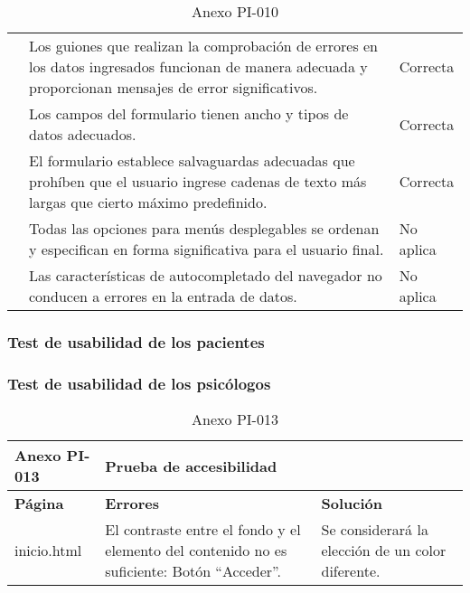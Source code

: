 \begin{table}[htpb]
\begin{tabularx}{\textwidth}{|l|X|l|}
                                      & Los guiones que realizan la comprobación de errores en los datos ingresados funcionan de manera adecuada y proporcionan mensajes de error significativos. & Correcta            \\ \cline{2-3} 
                                      & Los campos del formulario tienen ancho y tipos de datos adecuados.                                                                                        & Correcta            \\ \cline{2-3} 
                                      & El formulario establece salvaguardas adecuadas que prohíben que el usuario ingrese cadenas de texto más largas que cierto máximo predefinido.             & Correcta            \\ \cline{2-3} 
                                      & Todas las opciones para menús desplegables se ordenan y especifican en forma significativa para el usuario final.                                         & No aplica           \\ \cline{2-3} 
                                      & Las características de autocompletado del navegador no conducen a errores en la entrada de datos.                                                         & No aplica           \\ \hline
\end{tabularx}
\caption{Anexo PI-010}
\end{table}


\clearpage


\subsubsection{Test de usabilidad de los pacientes}



\newpage


\subsubsection{Test de usabilidad de los psicólogos}



\newpage


\begin{table}[htpb]
\centering
\begin{tabularx}{\textwidth}{|l|X|X|}
\hline
\textbf{Anexo PI-013} & \multicolumn{2}{l|}{\textbf{Prueba de accesibilidad}}                                                                                          \\ \hline
\textbf{Página}       & \textbf{Errores}                                                                           & \textbf{Solución}                                 \\ \hline
inicio.html           & El contraste entre el fondo y el elemento del contenido no es suficiente: Botón “Acceder”. & Se considerará la elección de un color diferente. \\ \hline
\end{tabularx}
\caption{Anexo PI-013}
\end{table}


